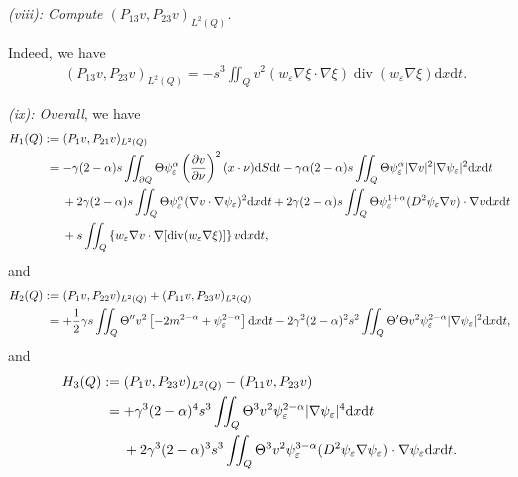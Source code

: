 \documentclass[11pt]{article}
\numberwithin{equation}{section}
\def\df{\mathrm d}
\DeclareMathOperator{\Div}{div}
\begin{document}
{\it (viii):  Compute $(P_{13}v, P_{23}v)_{L^2(Q)}$.}

Indeed, we have
\begin{equation*}
\begin{split}
&(P_{13}v, P_{23}v)_{L^2(Q)}=-s^3\iint_Q v^2(w_\varepsilon\nabla\xi\cdot\nabla\xi)\Div(w_\varepsilon\nabla\xi)\df x\df t.
\end{split}
\end{equation*}

{\it (ix):  Overall}, we have
\begin{equation*}
\begin{split}
H_1(Q):\hspace{-1mm}&=(P_1v,P_{21}v)_{L^2(Q)}\\
&=-\gamma(2-\alpha)s\iint_{\partial Q}\Theta \psi_\varepsilon^\alpha \left(\frac{\partial v}{\partial \nu}\right)^2(x\cdot \nu)\df S\df t-\gamma\alpha (2-\alpha) s\iint_Q\Theta \psi_\varepsilon^\alpha |\nabla v|^2|\nabla\psi_\varepsilon|^2\df x\df t\\
&\hspace{4.5mm}+2\gamma(2-\alpha)s\iint_Q\Theta \psi_\varepsilon^\alpha (\nabla v\cdot\nabla \psi_\varepsilon)^2\df x\df t+2\gamma(2-\alpha)s\iint_Q\Theta \psi_\varepsilon^{1+\alpha}(D^2\psi_\varepsilon\nabla v)\cdot \nabla v\df x\df t\\
&\hspace{4.5mm}+s\iint_Q \left\{w_\varepsilon \nabla v\cdot \nabla [\Div(w_\varepsilon\nabla \xi)]\right\}v\df x\df t,
\end{split}
\end{equation*}
and
\begin{equation*}
\begin{split}
H_2(Q):\hspace{-1mm}&=(P_1v, P_{22}v)_{L^2(Q)}+(P_{11}v,P_{23}v)_{L^2(Q)}\\
&=+\frac{1}{2}\gamma s\iint_Q\Theta'' v^2\left[-2m^{2-\alpha}+\psi_\varepsilon^{2-\alpha}\right]\df x\df t-2\gamma^2(2-\alpha)^2s^2\iint_Q \Theta'\Theta v^2 \psi_\varepsilon^{2-\alpha}|\nabla\psi_\varepsilon|^2\df x\df t,
\end{split}
\end{equation*}
and
\begin{equation*}
\begin{split}
H_3(Q):\hspace{-1mm}
&=(P_1v, P_{23}v)_{L^2(Q)}-(P_{11}v,P_{23}v)\\
&=+\gamma^3(2-\alpha)^4s^3\iint_Q \Theta^3 v^2\psi_\varepsilon^{2-\alpha}|\nabla\psi_\varepsilon|^4\df x\df t \\
&\hspace{4.5mm}+2\gamma^3(2-\alpha)^3s^3\iint_Q\Theta^3v^2\psi_\varepsilon^{3-\alpha}(D^2\psi_\varepsilon\nabla\psi_\varepsilon)\cdot\nabla\psi_\varepsilon\df x\df t.
\end{split}
\end{equation*}
\end{document}
